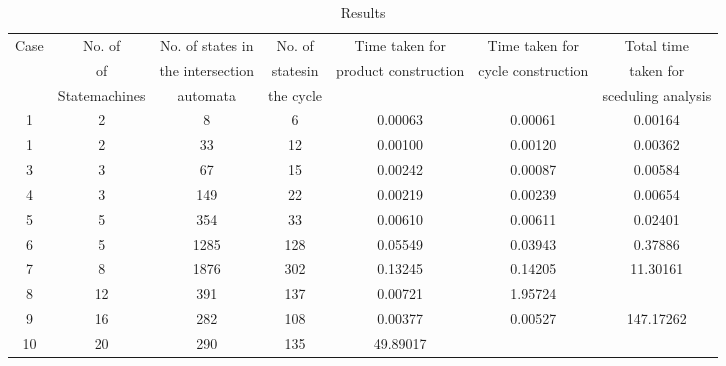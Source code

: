 \begin{table}[ht]
\caption{Results}
\centering
\begin{tabular}{|c | c | c | c | c | c | c |}
\hline %
Case & No. of           &  No. of states in   & No. of    &  Time taken for        &   Time taken for      & Total time           \\       
     & of               &  the intersection   & statesin  &  product construction  &   cycle construction  & taken for            \\  
     & Statemachines    &  automata           & the cycle  &                       &                       & sceduling analysis   \\
\hline
\hline
1 & 2 & 8 & 6 &  0.00063    & 0.00061 &  0.00164\\

1 & 2  & 33 & 12 &  0.00100  & 0.00120 &  0.00362 \\

3 & 3  & 67 & 15 & 0.00242 & 0.00087 & 0.00584 \\

4 & 3 & 149 & 22 & 0.00219 &  0.00239 & 0.00654 \\

5 & 5 & 354 & 33 &  0.00610 &  0.00611 & 0.02401 \\

6 & 5 & 1285 & 128 & 0.05549 & 0.03943 &  0.37886\\

7 & 8 & 1876 & 302 & 0.13245 & 0.14205 & 11.30161\\

8 & 12 & 391 & 137 & 0.00721           & 1.95724\\


9 & 16 & 282 & 108 & 0.00377 & 0.00527 & 147.17262 \\

10 & 20 & 290 & 135 & 49.89017 \\



\hline

\end{tabular}
\label{table:nonlin}

\end{table}



